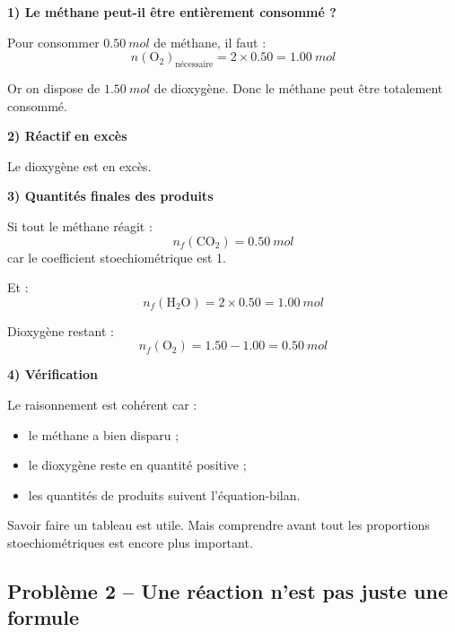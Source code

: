 \documentclass[11pt,a4paper]{article}
\begin{document}
\begin{corrigebox}
\textbf{1) Le méthane peut-il être entièrement consommé ?}

Pour consommer \(\SI{0.50}{mol}\) de méthane, il faut :
\[
n(\mathrm{O_2})_{\text{nécessaire}} = 2\times 0.50 = \SI{1.00}{mol}
\]

Or on dispose de \(\SI{1.50}{mol}\) de dioxygène.  
Donc le méthane peut être totalement consommé.

\textbf{2) Réactif en excès}

Le dioxygène est en excès.

\textbf{3) Quantités finales des produits}

Si tout le méthane réagit :
\[
n_f(\mathrm{CO_2}) = \SI{0.50}{mol}
\]
car le coefficient stoechiométrique est 1.

Et :
\[
n_f(\mathrm{H_2O}) = 2\times 0.50 = \SI{1.00}{mol}
\]

Dioxygène restant :
\[
n_f(\mathrm{O_2}) = 1.50 - 1.00 = \SI{0.50}{mol}
\]

\textbf{4) Vérification}

Le raisonnement est cohérent car :
\begin{itemize}
    \item le méthane a bien disparu ;
    \item le dioxygène reste en quantité positive ;
    \item les quantités de produits suivent l'équation-bilan.
\end{itemize}

\begin{methodebox}
Savoir faire un tableau est utile.  
Mais comprendre avant tout les proportions stoechiométriques est encore plus important.
\end{methodebox}
\end{corrigebox}

\subsection{Problème 2 -- Une réaction n'est pas juste une formule}
\end{document}
